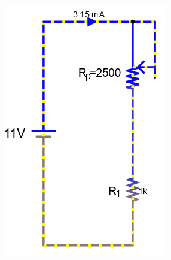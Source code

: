 \documentclass[a4paper]{article}
\begin{document}
\begin{figure}[H]
\begin{subfigure}{0.333\textwidth}
        \includegraphics[width=.9\linewidth]{amp11}
    \end{subfigure}
    \begin{subfigure}{0.333\textwidth}

\end{subfigure}
\end{figure}
\end{document}
